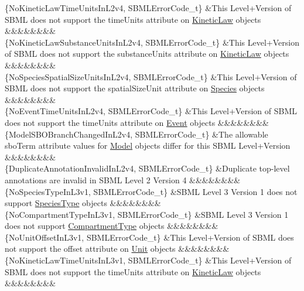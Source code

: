 \begin{DoxyParagraph}{}
\begin{longtabu}
\{No\+Kinetic\+Law\+Time\+Units\+In\+L2v4, S\+B\+M\+L\+Error\+Code\+\_\+t\} &This Level+\+Version of S\+B\+ML does not support the \textquotesingle{}time\+Units\textquotesingle{} attribute on \hyperlink{class_kinetic_law}{Kinetic\+Law} objects &&&&&&&&\\
\{No\+Kinetic\+Law\+Substance\+Units\+In\+L2v4, S\+B\+M\+L\+Error\+Code\+\_\+t\} &This Level+\+Version of S\+B\+ML does not support the \textquotesingle{}substance\+Units\textquotesingle{} attribute on \hyperlink{class_kinetic_law}{Kinetic\+Law} objects &&&&&&&&\\
\{No\+Species\+Spatial\+Size\+Units\+In\+L2v4, S\+B\+M\+L\+Error\+Code\+\_\+t\} &This Level+\+Version of S\+B\+ML does not support the \textquotesingle{}spatial\+Size\+Unit\textquotesingle{} attribute on \hyperlink{class_species}{Species} objects &&&&&&&&\\
\{No\+Event\+Time\+Units\+In\+L2v4, S\+B\+M\+L\+Error\+Code\+\_\+t\} &This Level+\+Version of S\+B\+ML does not support the \textquotesingle{}time\+Units\textquotesingle{} attribute on \hyperlink{class_event}{Event} objects &&&&&&&&\\
\{Model\+S\+B\+O\+Branch\+Changed\+In\+L2v4, S\+B\+M\+L\+Error\+Code\+\_\+t\} &The allowable \textquotesingle{}sbo\+Term\textquotesingle{} attribute values for \hyperlink{class_model}{Model} objects differ for this S\+B\+ML Level+\+Version &&&&&&&&\\
\{Duplicate\+Annotation\+Invalid\+In\+L2v4, S\+B\+M\+L\+Error\+Code\+\_\+t\} &Duplicate top-\/level annotations are invalid in S\+B\+ML Level 2 Version 4 &&&&&&&&\\
\{No\+Species\+Type\+In\+L3v1, S\+B\+M\+L\+Error\+Code\+\_\+t\} &S\+B\+ML Level 3 Version 1 does not support \hyperlink{class_species_type}{Species\+Type} objects &&&&&&&&\\
\{No\+Compartment\+Type\+In\+L3v1, S\+B\+M\+L\+Error\+Code\+\_\+t\} &S\+B\+ML Level 3 Version 1 does not support \hyperlink{class_compartment_type}{Compartment\+Type} objects &&&&&&&&\\
\{No\+Unit\+Offset\+In\+L3v1, S\+B\+M\+L\+Error\+Code\+\_\+t\} &This Level+\+Version of S\+B\+ML does not support the \textquotesingle{}offset\textquotesingle{} attribute on \hyperlink{class_unit}{Unit} objects &&&&&&&&\\
\{No\+Kinetic\+Law\+Time\+Units\+In\+L3v1, S\+B\+M\+L\+Error\+Code\+\_\+t\} &This Level+\+Version of S\+B\+ML does not support the \textquotesingle{}time\+Units\textquotesingle{} attribute on \hyperlink{class_kinetic_law}{Kinetic\+Law} objects &&&&&&&&\\

\end{longtabu}
\end{DoxyParagraph}
